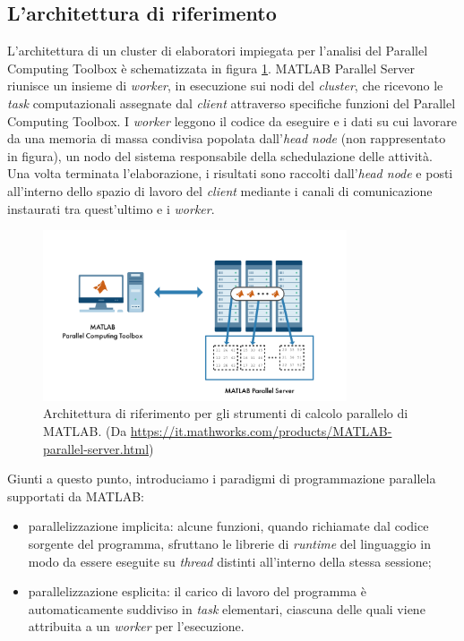 \subsection{L'architettura di riferimento}
L'architettura di un cluster di elaboratori impiegata per l'analisi del Parallel Computing Toolbox \`e schematizzata in figura \ref{fig:ArchitetturaRiferimento}.\newline
MATLAB Parallel Server riunisce un insieme di \textit{worker}, in esecuzione sui nodi del \textit{cluster}, che ricevono le 
\textit{task} computazionali assegnate dal \textit{client} attraverso specifiche funzioni del Parallel Computing Toolbox. \newline
I \textit{worker} leggono il codice da eseguire e i dati su cui lavorare da una memoria di massa condivisa popolata dall'\textit{head node} 
(non rappresentato in figura), un nodo del sistema responsabile della schedulazione delle attivit\`a.\newline
Una volta terminata l'elaborazione, i risultati sono raccolti dall'\textit{head node} e posti all'interno dello spazio di lavoro del \textit{client} 
mediante i canali di comunicazione instaurati tra quest'ultimo e i \textit{worker}.

\begin{figure}[htbp]
    \centering
    \includegraphics[width=0.8\textwidth]{../Risorse/Capitolo 2/ReferenceArchitecture.png}
    \caption{Architettura di riferimento per gli strumenti di calcolo parallelo di MATLAB. 
    \small{(Da \url{https://it.mathworks.com/products/MATLAB-parallel-server.html})}}
    \label{fig:ArchitetturaRiferimento}
\end{figure}

Giunti a questo punto, introduciamo i paradigmi di programmazione parallela supportati da MATLAB:
\begin{itemize}
    \item parallelizzazione implicita: alcune funzioni, quando richiamate dal codice sorgente del programma, sfruttano le librerie di \textit{runtime} del linguaggio 
    in modo da essere eseguite su \textit{thread} distinti all'interno della stessa sessione;
    \item parallelizzazione esplicita: il carico di lavoro del programma \`e automaticamente suddiviso in \textit{task} elementari, ciascuna delle quali viene 
    attribuita a un \textit{worker} per l'esecuzione.
\end{itemize}


